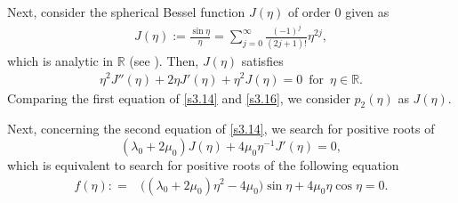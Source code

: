 \documentclass[a4paper,12pt]{article}
\newtheorem{a priori condition}[Th]{A priori condition}
\begin{document}
Next, consider the spherical Bessel function $J(\eta)$ of order $0$ given as
\begin{equation}\label{s3.15}
\begin{array}{l}
J(\eta):=\frac{\sin \eta}{\eta}=\displaystyle\sum_{j=0}^\infty\frac{(-1)^j}{(2j+1)!}\eta^{2j},
\end{array}
\end{equation}
which is analytic in ${\mathbb R}$ (see \cite{Kor02}). Then, $J(\eta)$ satisfies
\begin{equation}\label{s3.16}
\begin{aligned}
\eta^2 J''(\eta)+2\eta J'(\eta)+\eta^2 J(\eta)=0\,\,\,\text{for}\,\,\,\eta\in{\mathbb R}.
\end{aligned}
\end{equation}
Comparing the first equation of \eqref{s3.14} and \eqref{s3.16}, we consider $p_2(\eta)$ as $J(\eta)$.

Next, concerning the second equation of \eqref{s3.14}, we search for positive roots of  $$(\lambda_0+2\mu_0)J(\eta)+4\mu_0\eta^{-1}J'(\eta)=0,$$
which is equivalent to search for positive roots of the following equation
\begin{equation}\label{s3.17}
\begin{aligned}
f(\eta):
=&\big((\lambda_0+2\mu_0)\eta^2-4\mu_0\big)\sin\eta+4\mu_0\eta\cos\eta=0.
\end{aligned}
\end{equation}
\end{document}
